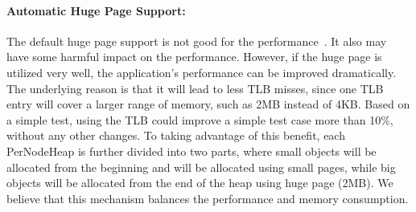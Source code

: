 

\paragraph{Automatic Huge Page Support:} The default huge page support is not good for the performance~\cite{}. It also may have some harmful impact on the performance. However, if the huge page is utilized very well, the application's performance can be improved dramatically. The underlying reason is that it will lead to less TLB misses, since one TLB entry will cover a larger range of memory, such as 2MB instead of 4KB. Based on a simple test, using the TLB could improve a simple test case more than 10\%, without any other changes. To taking advantage of this benefit, each PerNodeHeap is further divided into two parts, where small objects will be allocated from the beginning and will be allocated using small pages, while big objects will be allocated from the end of the heap using huge page (2MB). We believe that this mechanism balances the performance and memory consumption.   

